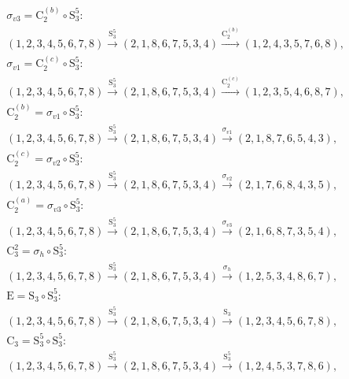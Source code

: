 \begin{align*}
& \sigma_{v3} = \mathrm{C}_{2}^{(b)} \circ \mathrm{S}_{3}^{5}:\; \\& (1,2,3,4,5,6,7,8) \xrightarrow{\mathrm{S}_{3}^{5}} (2,1,8,6,7,5,3,4) \xrightarrow{\mathrm{C}_{2}^{(b)}} (1,2,4,3,5,7,6,8), \\
& \sigma_{v1} = \mathrm{C}_{2}^{(c)} \circ \mathrm{S}_{3}^{5}:\; \\& (1,2,3,4,5,6,7,8) \xrightarrow{\mathrm{S}_{3}^{5}} (2,1,8,6,7,5,3,4) \xrightarrow{\mathrm{C}_{2}^{(c)}} (1,2,3,5,4,6,8,7), \\
& \mathrm{C}_{2}^{(b)} = \sigma_{v1} \circ \mathrm{S}_{3}^{5}:\; \\& (1,2,3,4,5,6,7,8) \xrightarrow{\mathrm{S}_{3}^{5}} (2,1,8,6,7,5,3,4) \xrightarrow{\sigma_{v1}} (2,1,8,7,6,5,4,3), \\
& \mathrm{C}_{2}^{(c)} = \sigma_{v2} \circ \mathrm{S}_{3}^{5}:\; \\& (1,2,3,4,5,6,7,8) \xrightarrow{\mathrm{S}_{3}^{5}} (2,1,8,6,7,5,3,4) \xrightarrow{\sigma_{v2}} (2,1,7,6,8,4,3,5), \\
& \mathrm{C}_{2}^{(a)} = \sigma_{v3} \circ \mathrm{S}_{3}^{5}:\; \\& (1,2,3,4,5,6,7,8) \xrightarrow{\mathrm{S}_{3}^{5}} (2,1,8,6,7,5,3,4) \xrightarrow{\sigma_{v3}} (2,1,6,8,7,3,5,4), \\
& \mathrm{C}_{3}^{2} = \sigma_{h} \circ \mathrm{S}_{3}^{5}:\; \\& (1,2,3,4,5,6,7,8) \xrightarrow{\mathrm{S}_{3}^{5}} (2,1,8,6,7,5,3,4) \xrightarrow{\sigma_{h}} (1,2,5,3,4,8,6,7), \\
& \mathrm{E} = \mathrm{S}_{3} \circ \mathrm{S}_{3}^{5}:\; \\& (1,2,3,4,5,6,7,8) \xrightarrow{\mathrm{S}_{3}^{5}} (2,1,8,6,7,5,3,4) \xrightarrow{\mathrm{S}_{3}} (1,2,3,4,5,6,7,8), \\
& \mathrm{C}_{3} = \mathrm{S}_{3}^{5} \circ \mathrm{S}_{3}^{5}:\; \\& (1,2,3,4,5,6,7,8) \xrightarrow{\mathrm{S}_{3}^{5}} (2,1,8,6,7,5,3,4) \xrightarrow{\mathrm{S}_{3}^{5}} (1,2,4,5,3,7,8,6), \\
\end{align*}